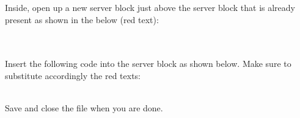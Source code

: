 \documentclass[a4paper]{article}
\newenvironment{Step}{%
	\begin{enumerate}[label= \textbf {Step} \arabic*,align=left, leftmargin=1.0cm]%
	}{
\end{enumerate}%
}
\begin{document}
\begin{Step}
Inside, open up a new server block just above the server block that is already present as shown in the below (red text):\\\\

\begin{minipage}[t]{\linewidth}
	\raggedright
\end{minipage}
\medskip \ \\
Insert the following code into the server block as shown below. Make sure to substitute accordingly the red texts:\\

\begin{minipage}[t]{\linewidth}
	\raggedright
\end{minipage}
\medskip \ \\

Save and close the file when you are done.


\end{Step}
\end{document}
